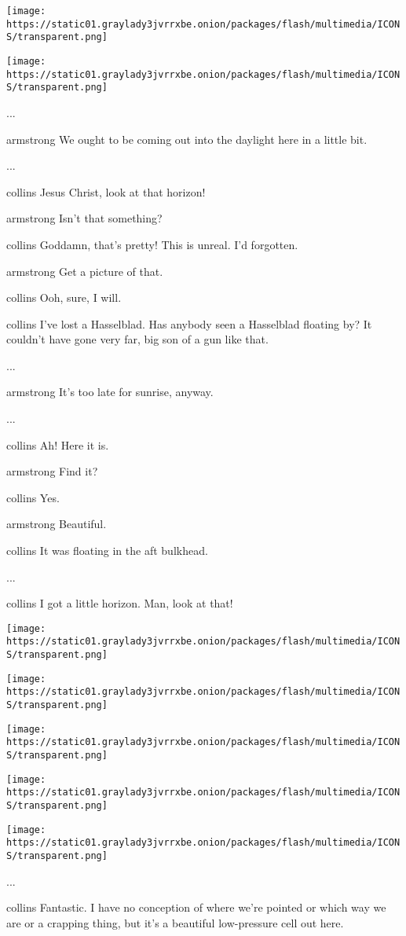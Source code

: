 \texttt{[image: https://static01.graylady3jvrrxbe.onion/packages/flash/multimedia/ICONS/transparent.png]}

\texttt{[image: https://static01.graylady3jvrrxbe.onion/packages/flash/multimedia/ICONS/transparent.png]}

...

armstrong We ought to be coming out into the daylight here in a little
bit.

...

collins Jesus Christ, look at that horizon!

armstrong Isn't that something?

collins Goddamn, that's pretty! This is unreal. I'd forgotten.

armstrong Get a picture of that.

collins Ooh, sure, I will.

collins I've lost a Hasselblad. Has anybody seen a Hasselblad floating
by? It couldn't have gone very far, big son of a gun like that.

...

armstrong It's too late for sunrise, anyway.

...

collins Ah! Here it is.

armstrong Find it?

collins Yes.

armstrong Beautiful.

collins It was floating in the aft bulkhead.

...

collins I got a little horizon. Man, look at that!

\texttt{[image: https://static01.graylady3jvrrxbe.onion/packages/flash/multimedia/ICONS/transparent.png]}

\texttt{[image: https://static01.graylady3jvrrxbe.onion/packages/flash/multimedia/ICONS/transparent.png]}

\texttt{[image: https://static01.graylady3jvrrxbe.onion/packages/flash/multimedia/ICONS/transparent.png]}

\texttt{[image: https://static01.graylady3jvrrxbe.onion/packages/flash/multimedia/ICONS/transparent.png]}

\texttt{[image: https://static01.graylady3jvrrxbe.onion/packages/flash/multimedia/ICONS/transparent.png]}

...

collins Fantastic. I have no conception of where we're pointed or which
way we are or a crapping thing, but it's a beautiful low-pressure cell
out here.

